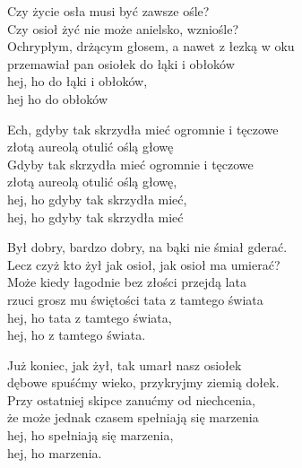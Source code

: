 \begin{text}
    Czy życie osła musi być zawsze ośle?\\
    Czy osioł żyć nie może anielsko, wzniośle?\\
    Ochrypłym, drżącym głosem, a nawet z łezką w oku\\
    przemawiał pan osiołek do łąki i obłoków\\
    hej, ho do łąki i obłoków,\\
    hej ho do obłoków

    Ech, gdyby tak skrzydła mieć ogromnie i tęczowe\\
    złotą aureolą otulić oślą głowę\\
    Gdyby tak skrzydła mieć ogromnie i tęczowe\\
    złotą aureolą otulić oślą głowę,\\
    hej, ho gdyby tak skrzydła mieć,\\
    hej, ho gdyby tak skrzydła mieć

    Był dobry, bardzo dobry, na bąki nie śmiał gderać.\\
    Lecz czyż kto żył jak osioł, jak osioł ma umierać?\\
    Może kiedy łagodnie bez złości przejdą lata\\
    rzuci grosz mu świętości tata z tamtego świata\\
    hej, ho tata z tamtego świata,\\
    hej, ho z tamtego świata.

    Już koniec, jak żył, tak umarł nasz osiołek\\
    dębowe spuśćmy wieko, przykryjmy ziemią dołek.\\
    Przy ostatniej skipce zanućmy od niechcenia,\\
    że może jednak czasem spełniają się marzenia\\
    hej, ho spełniają się marzenia,\\
    hej, ho marzenia.
\end{text}
